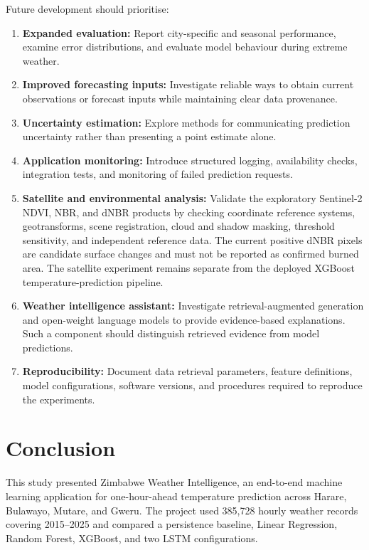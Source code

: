 \documentclass[12pt,a4paper]{article}
\begin{document}
	Future development should prioritise:
	\begin{enumerate}[leftmargin=*]
		\item \textbf{Expanded evaluation:} Report city-specific and
		seasonal performance, examine error distributions, and evaluate
		model behaviour during extreme weather.
		\item \textbf{Improved forecasting inputs:} Investigate reliable
		ways to obtain current observations or forecast inputs while
		maintaining clear data provenance.
		\item \textbf{Uncertainty estimation:} Explore methods for
		communicating prediction uncertainty rather than presenting a
		point estimate alone.
		\item \textbf{Application monitoring:} Introduce structured
		logging, availability checks, integration tests, and monitoring
		of failed prediction requests.
		\item \textbf{Satellite and environmental analysis:} Validate the
		exploratory Sentinel-2 NDVI, NBR, and dNBR products by checking
		coordinate reference systems, geotransforms, scene registration,
		cloud and shadow masking, threshold sensitivity, and independent
		reference data. The current positive dNBR pixels are candidate
		surface changes and must not be reported as confirmed burned area.
		The satellite experiment remains separate from the deployed
		XGBoost temperature-prediction pipeline.
		\item \textbf{Weather intelligence assistant:} Investigate
		retrieval-augmented generation and open-weight language models
		to provide evidence-based explanations. Such a component should
		distinguish retrieved evidence from model predictions.
		\item \textbf{Reproducibility:} Document data retrieval
		parameters, feature definitions, model configurations, software
		versions, and procedures required to reproduce the experiments.
	\end{enumerate}
	
	\section{Conclusion}
	
	This study presented Zimbabwe Weather Intelligence, an end-to-end
	machine learning application for one-hour-ahead temperature
	prediction across Harare, Bulawayo, Mutare, and Gweru. The project
	used 385,728 hourly weather records covering 2015--2025 and compared
	a persistence baseline, Linear Regression, Random Forest, XGBoost,
	and two LSTM configurations.
	
\end{document}
